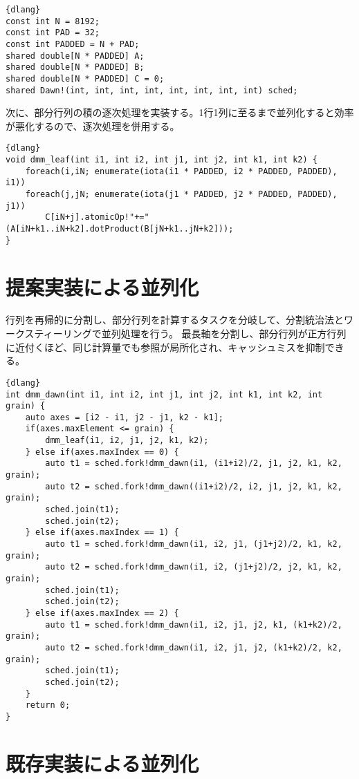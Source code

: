 \documentclass[10pt,a4paper]{book}
\begin{document}
\begin{Verbatim}{dlang}
const int N = 8192;
const int PAD = 32;
const int PADDED = N + PAD;
shared double[N * PADDED] A;
shared double[N * PADDED] B;
shared double[N * PADDED] C = 0;
shared Dawn!(int, int, int, int, int, int, int, int) sched;
\end{Verbatim}

次に、部分行列の積の逐次処理を実装する。1行1列に至るまで並列化すると効率が悪化するので、逐次処理を併用する。

\begin{Verbatim}{dlang}
void dmm_leaf(int i1, int i2, int j1, int j2, int k1, int k2) {
	foreach(i,iN; enumerate(iota(i1 * PADDED, i2 * PADDED, PADDED), i1))
	foreach(j,jN; enumerate(iota(j1 * PADDED, j2 * PADDED, PADDED), j1))
		C[iN+j].atomicOp!"+="(A[iN+k1..iN+k2].dotProduct(B[jN+k1..jN+k2]));
}
\end{Verbatim}

\section{提案実装による並列化\label{sect:dmm:dawn}}

行列を再帰的に分割し、部分行列を計算するタスクを分岐して、分割統治法とワークスティーリングで並列処理を行う。
最長軸を分割し、部分行列が正方行列に近付くほど、同じ計算量でも参照が局所化され、キャッシュミスを抑制できる。

\begin{Verbatim}{dlang}
int dmm_dawn(int i1, int i2, int j1, int j2, int k1, int k2, int grain) {
	auto axes = [i2 - i1, j2 - j1, k2 - k1];
	if(axes.maxElement <= grain) {
		dmm_leaf(i1, i2, j1, j2, k1, k2);
	} else if(axes.maxIndex == 0) {
		auto t1 = sched.fork!dmm_dawn(i1, (i1+i2)/2, j1, j2, k1, k2, grain);
		auto t2 = sched.fork!dmm_dawn((i1+i2)/2, i2, j1, j2, k1, k2, grain);
		sched.join(t1);
		sched.join(t2);
	} else if(axes.maxIndex == 1) {
		auto t1 = sched.fork!dmm_dawn(i1, i2, j1, (j1+j2)/2, k1, k2, grain);
		auto t2 = sched.fork!dmm_dawn(i1, i2, (j1+j2)/2, j2, k1, k2, grain);
		sched.join(t1);
		sched.join(t2);
	} else if(axes.maxIndex == 2) {
		auto t1 = sched.fork!dmm_dawn(i1, i2, j1, j2, k1, (k1+k2)/2, grain);
		auto t2 = sched.fork!dmm_dawn(i1, i2, j1, j2, (k1+k2)/2, k2, grain);
		sched.join(t1);
		sched.join(t2);
	}
	return 0;
}
\end{Verbatim}

\section{既存実装による並列化}
\end{document}
